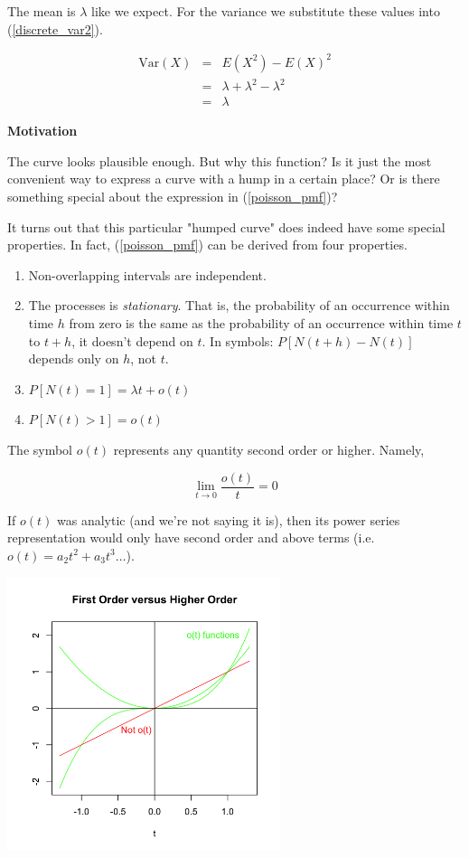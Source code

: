 \documentclass[]{article}
\begin{document}
The mean is $\lambda$ like we expect.  For the variance we
substitute these values into (\ref{discrete_var2}).

\begin{eqnarray}
\mbox{Var}(X) & = & E(X^2) - E(X)^2 \nonumber \\
   & = & \lambda + \lambda^2 - \lambda^2 \nonumber \\
   & = & \lambda \label{poisson_var}
\end{eqnarray}

\textbf{Motivation}

The curve looks plausible
enough.  But why this function?  Is it just the most
convenient way to express a curve with a hump in a certain
place?  Or is there something special about the expression
in (\ref{poisson_pmf})?

It turns out that this particular "humped curve" does indeed
have some special properties.  In fact, (\ref{poisson_pmf})
can be derived from four properties.

\begin{enumerate}  \label{poisson_properties}

\item Non-overlapping intervals are independent.

\item The processes is \emph{stationary}.  That is,
  the probability of an occurrence within time $h$
  from zero is the same as the probability of an occurrence
  within time $t$ to $t + h$, it doesn't depend on $t$.
  In symbols: $P[N(t+h)-N(t)]$ depends only on $h$, not $t$.
  
\item $P[N(t) = 1] = \lambda t + o(t)$

\item $P[N(t) > 1] = o(t)$

\end{enumerate}

The symbol $o(t)$ represents any quantity second order or
higher.  Namely,

$$
\lim_{t \rightarrow 0} \frac{o(t)}{t} = 0
$$

If $o(t)$ was analytic (and we're not saying it is), then
its power series representation would only have second
order and above terms (i.e. $o(t) = a_2t^2 + a_3t^3 \ldots$).

  \includegraphics[height=8cm,keepaspectratio]{ot.png}
\end{document}
